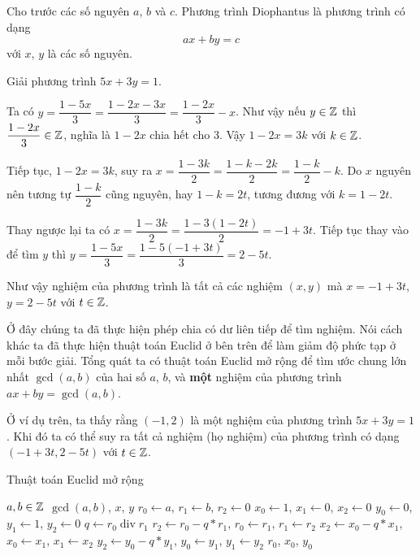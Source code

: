 \begin{definition}
    Cho trước các số nguyên $a$, $b$ và $c$. Phương trình  Diophantus là phương trình có dạng
    \[ax + by = c\]
    với $x$, $y$ là các số nguyên.
\end{definition}

\begin{example}
    Giải phương trình $5x+3y = 1$.

    Ta có $y = \dfrac{1-5x}{3} = \dfrac{1-2x-3x}{3} = \dfrac{1-2x}{3} - x$. Như vậy nếu $y \in \mathbb{Z}$ thì $\dfrac{1-2x}{3} \in \mathbb{Z}$, nghĩa là $1-2x$ chia hết cho 3. Vậy $1-2x = 3k$ với $k \in \mathbb{Z}$.

    Tiếp tục, $1-2x = 3k$, suy ra $x = \dfrac{1-3k}{2}  = \dfrac{1-k-2k}{2} = \dfrac{1-k}{2} - k$. Do $x$ nguyên nên tương tự $\dfrac{1-k}{2}$ cũng nguyên, hay $1-k = 2t$, tương đương với $k = 1-2t$.

    Thay ngược lại ta có $x = \dfrac{1-3k}{2} = \dfrac{1-3(1-2t)}{2} = {-1+3t}$. Tiếp tục thay vào để tìm $y$ thì $y = \dfrac{1-5x}{3} = \dfrac{1-5(-1+3t)}{3} = 2 - 5t$.

    Như vậy nghiệm của phương trình là tất cả các nghiệm $(x, y)$ mà $x = -1+3t$, $y = 2-5t$ với $t \in \mathbb{Z}$.
\end{example}

Ở đây chúng ta đã thực hiện phép chia có dư liên tiếp để tìm nghiệm. Nói cách khác ta đã thực hiện thuật toán Euclid ở bên trên để làm giảm độ phức tạp ở mỗi bước giải. Tổng quát ta có thuật toán Euclid mở rộng để tìm ước chung lớn nhất $\gcd(a, b)$ của hai số $a$, $b$, và \textbf{một} nghiệm của phương trình $ax + by = \gcd(a, b)$.

Ở ví dụ trên, ta thấy rằng $(-1, 2)$ là một nghiệm của phương trình $5x + 3y = 1$. Khi đó ta có thể suy ra tất cả nghiệm (họ nghiệm) của phương trình có dạng $(-1+3t, 2-5t)$ với $t \in \mathbb{Z}$.

\begin{algorithm}
    \caption{Thuật toán Euclid mở rộng}
    \begin{algorithmic}
        \Require $a, b \in \mathbb{Z}$
        \Ensure $\gcd(a, b)$, $x$, $y$ 
        \State $r_0 \gets a$, $r_1 \gets b$, $r_2 \gets 0$
        \State $x_0 \gets 1$, $x_1 \gets 0$, $x_2 \gets 0$
        \State $y_0 \gets 0$, $y_1 \gets 1$, $y_2 \gets 0$
            \State $q \gets r_0 \;\text{div}\; r_1$
            \State $r_2 \gets r_0 - q * r_1$, $r_0 \gets r_1$, $r_1 \gets r_2$
            \State $x_2 \gets x_0 - q * x_1$, $x_0 \gets x_1$, $x_1 \gets x_2$
            \State $y_2 \gets y_0 - q * y_1$, $y_0 \gets y_1$, $y_1 \gets y_2$
        \EndWhile
        \State \Return $r_0$, $x_0$, $y_0$
    \end{algorithmic}
\end{algorithm}

